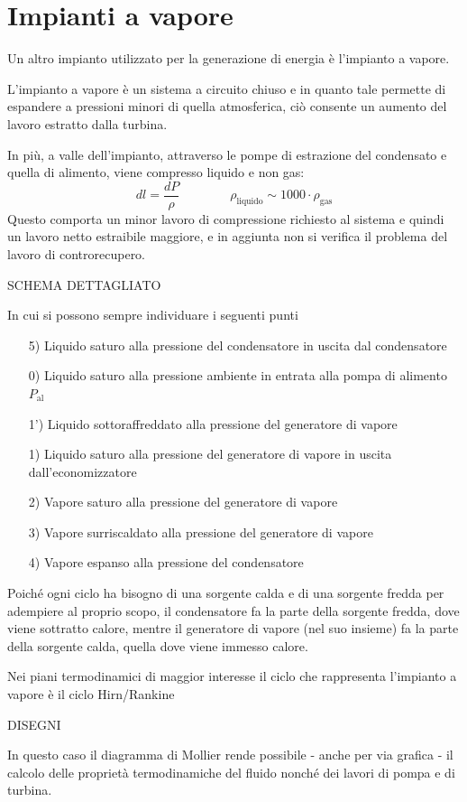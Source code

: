 \part{Impianti a vapore}
\begin{adjustwidth}{2in}{}
	Un altro impianto utilizzato per la generazione di energia è l'impianto a vapore. 
	
	L'impianto a vapore è un sistema a circuito chiuso e in quanto tale permette di espandere a pressioni minori di quella atmosferica, ciò consente un aumento del lavoro estratto dalla turbina. 
	
	In più, a valle dell'impianto, attraverso le pompe di estrazione del condensato e quella di alimento, viene compresso liquido e non gas:
	\[dl = \dfrac{dP}{\rho} \qquad\qquad \rho_\text{liquido}\sim1000\cdot\rho_\text{gas}\]
	Questo comporta un minor lavoro di compressione richiesto al sistema e quindi un lavoro netto estraibile maggiore, e in aggiunta non si verifica il problema del lavoro di controrecupero. 
	
	SCHEMA DETTAGLIATO
	
	In cui si possono sempre individuare i seguenti punti
	\begin{itemize}
		\item[5)] Liquido saturo alla pressione del condensatore in uscita dal condensatore
		\item[0)] Liquido saturo alla pressione ambiente in entrata alla pompa di alimento $P_\text{al}$
		\item[1')] Liquido sottoraffreddato alla pressione del generatore di vapore
		\item[1)] Liquido saturo alla pressione del generatore di vapore in uscita dall'economizzatore
		\item[2)] Vapore saturo alla pressione del generatore di vapore
		\item[3)] Vapore surriscaldato alla pressione del generatore di vapore
		\item[4)] Vapore espanso alla pressione del condensatore				
	\end{itemize}
	
	Poiché ogni ciclo ha bisogno di una sorgente calda e di una sorgente fredda per adempiere al proprio scopo, il condensatore fa la parte della sorgente fredda, dove viene sottratto calore, mentre il generatore di vapore (nel suo insieme) fa la parte della sorgente calda, quella dove viene immesso calore. \newline 
	
	Nei piani termodinamici di maggior interesse il ciclo che rappresenta l'impianto a vapore è il ciclo Hirn/Rankine
	
	DISEGNI
	
	In questo caso il diagramma di Mollier rende possibile - anche per via grafica - il calcolo delle proprietà termodinamiche del fluido nonché dei lavori di pompa e di turbina.
\end{adjustwidth}



